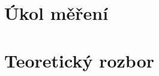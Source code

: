 \documentclass{praktikum}
\begin{document}
\maketitle
\vspace{0.5 cm}


\section{Úkol měření}
\section{Teoretický rozbor}
\end{document}
